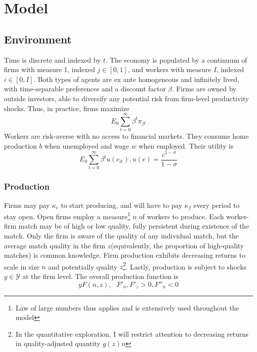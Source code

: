 \section{Model}
\subsection{Environment} %
Time is discrete and indexed by $t$. The economy is populated by a continuum of firms with measure 1, indexed $j \in [0,1]$, and workers with measure $I$, indexed $i \in [0,I]$. Both types of agents are ex ante homogeneous and infinitely lived, with time-separable preferences and a discount factor $\beta$. Firms are owned by outside investors, able to diversify any potential risk from firm-level productivity shocks. Thus, in practice, firms maximize
\[E_0 \sum_{t=0}^\infty \beta^t \pi_{jt}\]
Workers are risk-averse with no access to financial markets. They consume home production $b$ when unemployed and wage $w$ when employed. Their utility is
\[E_0 \sum_{t=0}^\infty \beta^t u(c_{it}), u(c) = \frac{c^{1-\sigma}}{1-\sigma}\]
\subsubsection*{Production}
Firms may pay $\kappa_e$ to start producing, and will have to pay $\kappa_f$ every period to stay open.
Open firms employ a measure\footnote{Law of large numbers thus applies and is extensively used throughout the model} $n$ of workers to produce. Each worker-firm match may be of high or low quality, fully persistent during existence of the match. Only the firm is aware of the quality of any individual match, but the average match quality in the firm $z$(equivalently, the proportion of high-quality matches) is common knowledge. Firm production exhibits decreasing returns to scale in size $n$ and potentially quality $z$\footnote{In the quantitative exploration, I will restrict attention to decreasing returns in quality-adjusted quantity $g(z)n$}. Lastly, production is subject to shocks $y\in \mathcal{Y}$ at the firm level. The overall production function is \[yF(n,z),\:\:\:F'_n,F'_z>0, F''_{n}<0\]


